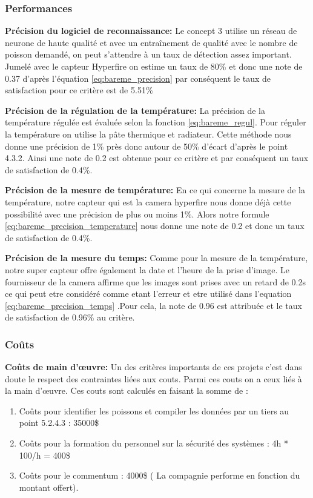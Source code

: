 \subsubsection{Performances}

\textbf{Précision du logiciel de reconnaissance:}
Le concept 3 utilise un réseau de neurone  de haute qualité et avec un entraînement de qualité avec le nombre de poisson demandé, on peut s’attendre à un taux de détection assez important. Jumelé avec le capteur Hyperfire on estime un taux de 80\% et donc une note de 0.37 d’après l’équation \ref{eq:bareme_precision} par conséquent le taux de satisfaction pour ce critère est de 5.51\%
\vspace{5mm}


\textbf{Précision de la régulation de la température:}
La précision de la température régulée est évaluée selon la fonction \ref{eq:bareme_regul}. Pour réguler la température on utilise la pâte thermique et radiateur. Cette méthode nous donne une précision de 1\% près donc autour de 50\% d’écart d’après le point 4.3.2. Ainsi une note de 0.2 est obtenue pour ce critère et par conséquent un taux de satisfaction de 0.4\%.
\vspace{5mm}


\textbf{Précision de la mesure de température:} En ce qui concerne la mesure de la température, notre capteur qui est la camera hyperfire nous donne déjà cette possibilité avec une précision de plus ou moins 1\%. Alors notre formule \ref{eq:bareme_precision_temperature} nous donne une note de 0.2 et donc un taux de satisfaction de 0.4\%.
\vspace{5mm}


\textbf{Précision de la mesure du temps:} Comme pour la mesure de la température, notre super capteur offre également la date et l’heure de la prise d’image. Le fournisseur de la camera affirme que les images sont prises avec un retard de 0.2s ce qui peut etre considéré comme etant l’erreur et etre utilisé dans l’equation \ref{eq:bareme_precision_temps} .Pour cela, la note de 0.96 est attribuée et le taux de satisfaction de 0.96\% au critère.


\subsubsection{Coûts}


\textbf{Coûts de main d’œuvre:} Un des critères importants de ces projets c’est dans doute le respect des contraintes liées aux couts. Parmi ces couts on a ceux liés à la main d’œuvre. Ces couts sont calculés en faisant la somme de : 
\begin{enumerate}
    \item Coûts pour identifier les poissons et compiler les données par un tiers au point 5.2.4.3 : 35000\$
    \item Coûts pour la formation du personnel sur la sécurité des systèmes : 4h * 100/h = 400\$
    \item Coûts pour le commentum : 4000\$ ( La compagnie performe en fonction du montant offert).
\end{enumerate}


